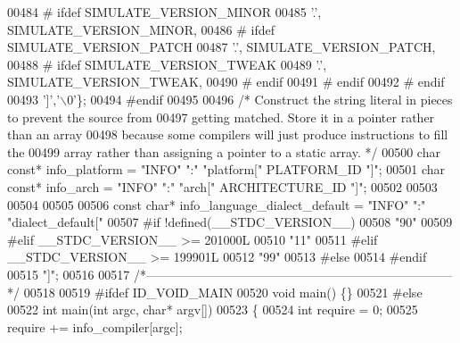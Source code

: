 \begin{DoxyCode}
{{{{{{{{{{{{{{{{{{{{{{{{{{{{{{{{{{{{{{{{{{{{00484 \textcolor{preprocessor}{# ifdef SIMULATE\_VERSION\_MINOR}
00485   \textcolor{charliteral}{'.'}, SIMULATE\_VERSION\_MINOR,
00486 \textcolor{preprocessor}{#  ifdef SIMULATE\_VERSION\_PATCH}
00487    \textcolor{charliteral}{'.'}, SIMULATE\_VERSION\_PATCH,
00488 \textcolor{preprocessor}{#   ifdef SIMULATE\_VERSION\_TWEAK}
00489     \textcolor{charliteral}{'.'}, SIMULATE\_VERSION\_TWEAK,
00490 \textcolor{preprocessor}{#   endif}
00491 \textcolor{preprocessor}{#  endif}
00492 \textcolor{preprocessor}{# endif}
00493   \textcolor{charliteral}{']'},\textcolor{charliteral}{'\(\backslash\)0'}\};
00494 \textcolor{preprocessor}{#endif}
00495 
00496 \textcolor{comment}{/* Construct the string literal in pieces to prevent the source from}
00497 \textcolor{comment}{   getting matched.  Store it in a pointer rather than an array}
00498 \textcolor{comment}{   because some compilers will just produce instructions to fill the}
00499 \textcolor{comment}{   array rather than assigning a pointer to a static array.  */}
00500 \textcolor{keywordtype}{char} \textcolor{keyword}{const}* info_platform = \textcolor{stringliteral}{"INFO"} \textcolor{stringliteral}{":"} \textcolor{stringliteral}{"platform["} PLATFORM_ID \textcolor{stringliteral}{"]"};
00501 \textcolor{keywordtype}{char} \textcolor{keyword}{const}* info_arch = \textcolor{stringliteral}{"INFO"} \textcolor{stringliteral}{":"} \textcolor{stringliteral}{"arch["} ARCHITECTURE_ID \textcolor{stringliteral}{"]"};
00502 
00503 
00504 
00505 
00506 \textcolor{keyword}{const} \textcolor{keywordtype}{char}* info_language_dialect_default = \textcolor{stringliteral}{"INFO"} \textcolor{stringliteral}{":"} \textcolor{stringliteral}{"dialect\_default["}
00507 \textcolor{preprocessor}{#if !defined(\_\_STDC\_VERSION\_\_)}
00508   \textcolor{stringliteral}{"90"}
00509 \textcolor{preprocessor}{#elif \_\_STDC\_VERSION\_\_ >= 201000L}
00510   \textcolor{stringliteral}{"11"}
00511 \textcolor{preprocessor}{#elif \_\_STDC\_VERSION\_\_ >= 199901L}
00512   \textcolor{stringliteral}{"99"}
00513 \textcolor{preprocessor}{#else}
00514 \textcolor{preprocessor}{#endif}
00515 \textcolor{stringliteral}{"]"};
00516 
00517 \textcolor{comment}{/*--------------------------------------------------------------------------*/}
00518 
00519 \textcolor{preprocessor}{#ifdef ID\_VOID\_MAIN}
00520 \textcolor{keywordtype}{void} main() \{\}
00521 \textcolor{preprocessor}{#else}
00522 \textcolor{keywordtype}{int} main(\textcolor{keywordtype}{int} argc, \textcolor{keywordtype}{char}* argv[])
00523 \{
00524   \textcolor{keywordtype}{int} require = 0;
00525   require += info_compiler[argc];
}}}}}}}}}}}}}}}}}}}}}}}}}}}}}}}}}}}}}}}}}}}}
\end{DoxyCode}
